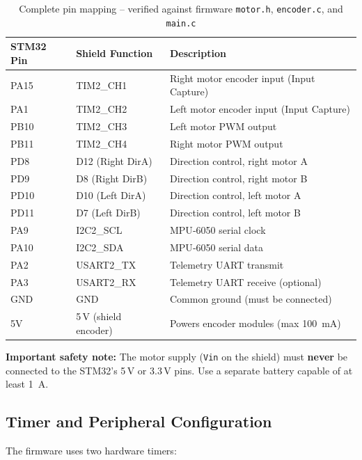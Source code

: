\documentclass[12pt,a4paper]{article}
\newcommand{\file}[1]{\texttt{#1}}
\begin{document}
	\begin{table}[H]
		\centering
		\caption{Complete pin mapping -- verified against firmware \file{motor.h}, \file{encoder.c}, and \file{main.c}}
		\label{tab:pins}
		\begin{tabular}{@{}lll@{}}
			\toprule
			\textbf{STM32 Pin} & \textbf{Shield Function} & \textbf{Description} \\
			\midrule
			PA15  & TIM2\_CH1 & Right motor encoder input (Input Capture) \\
			PA1  & TIM2\_CH2 & Left motor encoder input (Input Capture) \\
			PB10 & TIM2\_CH3 & Left motor PWM output \\
			PB11 & TIM2\_CH4 & Right motor PWM output \\
			PD8  & D12 (Right DirA) & Direction control, right motor A \\
			PD9  & D8  (Right DirB) & Direction control, right motor B \\
			PD10 & D10 (Left DirA)  & Direction control, left motor A  \\
			PD11 & D7  (Left DirB)  & Direction control, left motor B  \\
			PA9  & I2C2\_SCL & MPU‑6050 serial clock \\
			PA10 & I2C2\_SDA & MPU‑6050 serial data \\
			PA2  & USART2\_TX & Telemetry UART transmit \\
			PA3  & USART2\_RX & Telemetry UART receive (optional) \\
			GND  & GND & Common ground (must be connected) \\
			5V   & 5\,V (shield encoder) & Powers encoder modules (max \SI{100}{\milli\ampere}) \\
			\bottomrule
		\end{tabular}
	\end{table}
	
	\noindent\textbf{Important safety note:} The motor supply (\texttt{Vin} on the shield) must \textbf{never} be connected to the STM32’s 5\,V or 3.3\,V pins. Use a separate battery capable of at least \SI{1}{\ampere}.
	
	\subsection{Timer and Peripheral Configuration}
	The firmware uses two hardware timers:
	
\end{document}
